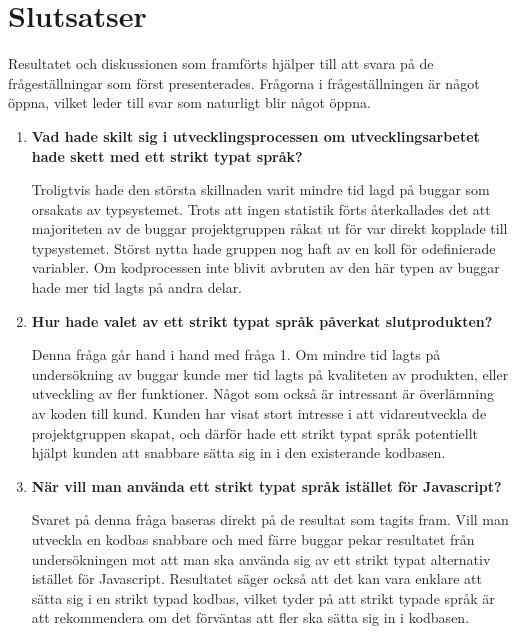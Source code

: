 \section{Slutsatser}
\label{sec:alexander-conclusion}

Resultatet och diskussionen som framförts hjälper till att svara på de frågeställningar som först presenterades.  Frågorna i frågeställningen är något öppna, vilket leder till svar som naturligt blir något öppna.

\begin{enumerate}
    \item \textbf{Vad hade skilt sig i utvecklingsprocessen om utvecklingsarbetet hade skett med ett strikt typat språk?}

    Troligtvis hade den största skillnaden varit mindre tid lagd på buggar som orsakats av typsystemet. Trots att ingen statistik förts återkallades det att majoriteten av de buggar projektgruppen råkat ut för var direkt kopplade till typsystemet. Störst nytta hade gruppen nog haft av en koll för odefinierade variabler. Om kodprocessen inte blivit avbruten av den här typen av buggar hade mer tid lagts på andra delar.

    \item \textbf{Hur hade valet av ett strikt typat språk påverkat slutprodukten?}

    Denna fråga går hand i hand med fråga 1. Om mindre tid lagts på undersökning av buggar kunde mer tid lagts på kvaliteten av produkten, eller utveckling av fler funktioner. Något som också är intressant är överlämning av koden till kund. Kunden har visat stort intresse i att vidareutveckla de projektgruppen skapat, och därför hade ett strikt typat språk potentiellt hjälpt kunden att snabbare sätta sig in i den existerande kodbasen.

    \item \textbf{När vill man använda ett strikt typat språk istället för Javascript?}
    
    Svaret på denna fråga baseras direkt på de resultat som tagits fram. Vill man utveckla en kodbas snabbare och med färre buggar pekar resultatet från undersökningen mot att man ska använda sig av ett strikt typat alternativ istället för Javascript. Resultatet säger också att det kan vara enklare att sätta sig i en strikt typad kodbas, vilket tyder på att strikt typade språk är att rekommendera om det förväntas att fler ska sätta sig in i kodbasen.  
\end{enumerate}